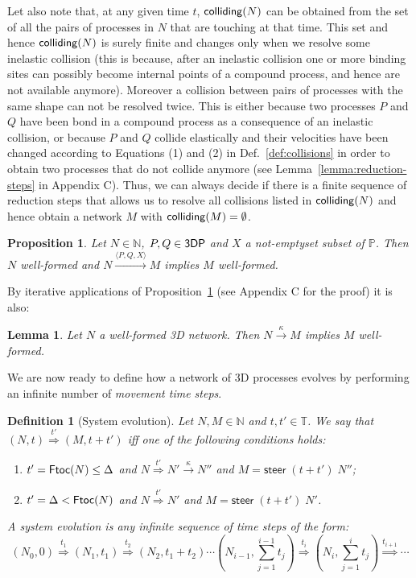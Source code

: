 \documentclass[11pt]{article}
\newcommand{\proc}{\sf{3DP}}
\newcommand{\colliding}{{\sf colliding}}
\newcommand{\ftoc}{{\sf Ftoc}}
\newcommand{\mts}{\Delta}
\newcommand{\move}{\ensuremath{\mathsf{steer}}}
\newcommand{\nar}[1]{\xrightarrow{#1}}
\newcommand{\dnar}[1]{\stackrel{#1}{\Rightarrow}}
\newcommand{\pos}{{\mathbb P}}
\newcommand{\nets}{{\mathbb N}}
\newcommand{\timedomain}{{\mathbb T}}
\newtheorem{definition}{Definition}
\newtheorem{proposition}{Proposition}
\newtheorem{lemma}{Lemma}
\begin{document}
Let also note that, at any given time $t$, $\colliding(N)$ can be obtained from the set of all the pairs of processes in $N$ that are touching at that time. This set and hence $\colliding(N)$ is surely finite and changes only when we resolve some inelastic collision (this is because, after an inelastic collision one or more binding sites can possibly become internal points of a compound process, and hence are not available anymore). Moreover a collision between pairs of processes with the same shape can not be resolved twice. This is either because two processes $P$ and $Q$  have been bond in a compound process as a consequence of an inelastic collision, or because $P$ and $Q$ collide elastically and their velocities have been changed according to Equations (1) and (2) in Def.~\ref{def:collisions} in order to obtain two processes that do not collide anymore (see Lemma~\ref{lemma:reduction-steps} in Appendix C). Thus, we can always decide if there is a finite sequence of reduction steps that allows us to resolve all collisions listed in $\colliding(N)$  and hence obtain a network $M$ with $\colliding(M) = \emptyset$.


\begin{proposition}\label{prop:reduction-closure}
Let $N \in \nets$, $P,Q \in \proc$ and $X$ a not-emptyset subset of $\pos$. Then $N$ well-formed
and $N \nar{\langle P, Q, X \rangle} M$ implies $M$ well-formed.
\end{proposition}


By iterative applications of Proposition~\ref{prop:reduction-closure} (see Appendix C for the proof)
it is also:

\begin{lemma}\rm\label{lemma:reduction-closure}
Let $N$ a well-formed 3D network. Then $N \nar{\kappa} M$ implies $M$ well-formed.
\end{lemma}


We are now ready to define how a network of 3D processes evolves by performing an infinite number of {\em movement time steps}.

\begin{definition}[System evolution]\label{def:mts}
Let $N, M \in \nets$  and $t, t'\in \timedomain$. We say that $(N, t) \dnar{t'} (M, t + t')$ iff one of the following conditions holds:

\begin{enumerate}
\item $t' =\ftoc (N) \leq \mts$ and $N \dnar{t'} N' \nar{\kappa} N'' $ and $M = \move \;  (t+ t') \; N''$;

\item $t' = \mts < \ftoc (N) $ and $N \dnar{t'} N'$ and $M = \move \; (t+ t') \; N'$.
\end{enumerate}


A {\em system evolution} is any infinite sequence of time steps of the form:
$$(N_0,0) \dnar{t_1} (N_1, t_1) \dnar{t_2} (N_2, t_1 + t_2)
\cdots (N_{i-1},  \sum\limits_{j=1}^{i-1} t_j) \dnar{t_i} (N_{i}, \sum\limits_{j=1}^{i} t_j )
\dnar{t_{i+1}} \cdots$$
\end{definition}
\end{document}
